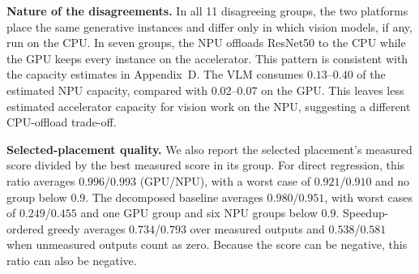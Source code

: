 \documentclass{article}
\begin{document}
\textbf{Nature of the disagreements.} In all 11 disagreeing groups, the two platforms place the same generative instances and differ only in which vision models, if any, run on the CPU. In seven groups, the NPU offloads ResNet50 to the CPU while the GPU keeps every instance on the accelerator. This pattern is consistent with the capacity estimates in Appendix~D. The VLM consumes $0.13$--$0.40$ of the estimated NPU capacity, compared with $0.02$--$0.07$ on the GPU. This leaves less estimated accelerator capacity for vision work on the NPU, suggesting a different CPU-offload trade-off.

\textbf{Selected-placement quality.} We also report the selected placement's measured score divided by the best measured score in its group. For direct regression, this ratio averages $0.996$/$0.993$ (GPU/NPU), with a worst case of $0.921$/$0.910$ and no group below $0.9$. The decomposed baseline averages $0.980$/$0.951$, with worst cases of $0.249$/$0.455$ and one GPU group and six NPU groups below $0.9$. Speedup-ordered greedy averages $0.734$/$0.793$ over measured outputs and $0.538$/$0.581$ when unmeasured outputs count as zero. Because the score can be negative, this ratio can also be negative.
\end{document}

